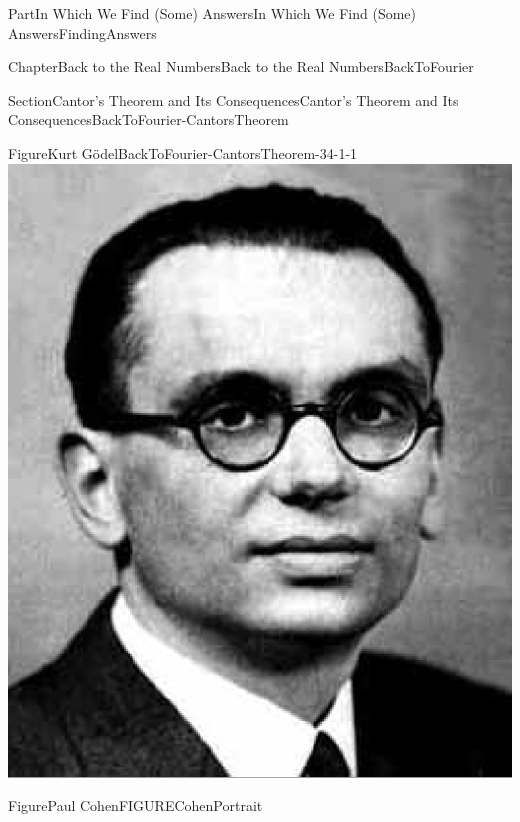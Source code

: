 \documentclass[oneside,10pt,]{book}
\numberwithin{equation}{part}
\begin{document}
\begin{partptx}{Part}{In Which We Find (Some) Answers}{}{In Which We Find (Some) Answers}{}{}{FindingAnswers}
\begin{chapterptx}{Chapter}{Back to the Real Numbers}{}{Back to the Real Numbers}{}{}{BackToFourier}
\begin{sectionptx}{Section}{Cantor's Theorem and Its Consequences}{}{Cantor's Theorem and Its Consequences}{}{}{BackToFourier-CantorsTheorem}
\begin{sidebyside}{2}{0.075}{0.075}{0.15}
\begin{sbspanel}{0.35}
\begin{panelfigureptx}{Figure}{Kurt Gödel}{BackToFourier-CantorsTheorem-34-1-1}{}
\noindent\includegraphics[width=\linewidth]{external/images/Godel.png}
\tcblower
\end{panelfigureptx}%
\end{sbspanel}%
\begin{sbspanel}{0.35}%
\begin{panelfigureptx}{Figure}{Paul Cohen}{FIGURECohenPortrait}{}%
%
%

\end{panelfigureptx}
\end{sbspanel}
\end{sidebyside}
\end{sectionptx}
\end{chapterptx}
\end{partptx}
\end{document}
